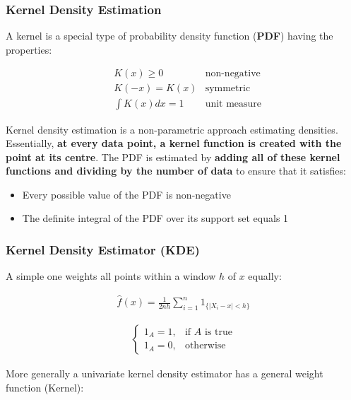 \subsubsection{Kernel Density Estimation}

\indent

A kernel is a special type of probability density function (\textbf{PDF}) having the properties:

\begin{align*}
    & K(x)\geq 0 & \text{non-negative}\\
    & K(-x) = K(x)& \text{symmetric} \\
    & \int K(x) dx = 1 & \text{unit measure}
\end{align*}

Kernel density estimation is a non-parametric approach estimating densities. Essentially, \textbf{at every data point, a kernel function is created with the point at its centre}. The PDF is estimated by \textbf{adding all of these kernel functions and dividing by the number of data} to ensure that it satisfies:

\begin{itemize}
    \item Every possible value of the PDF is non-negative
    \item The definite integral of the PDF over its support set equals 1
\end{itemize}

\subsubsection{Kernel Density Estimator (KDE)}

\indent

A simple one weights all points within a window $h$ of $x$ equally:

\begin{align*}
    \hat{f}(x) = \frac{1}{2nh}\sum_{i=1}^{n}1_{\{|X_i-x|<h\}}
\end{align*}

\begin{align*}
\begin{cases}
    1_{A} = 1,& \text{if $A$ is true}\\
    1_{A} = 0,& \text{otherwise}
\end{cases}
\end{align*}

More generally a univariate kernel density estimator has a general weight function (Kernel):

